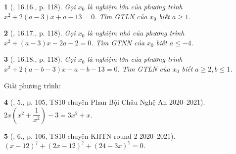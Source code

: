 \documentclass{article}
\newtheorem{baitoan}{}
\begin{document}
\begin{baitoan}[\cite{TLCT_THCS_Toan_9_dai_so}, 16.16., p. 118]
	Gọi $x_0$ là nghiệm lớn của phương trình $x^2 + 2(a - 3)x + a - 13 = 0$. Tìm {\rm GTLN} của $x_0$ biết $a\ge1$.
\end{baitoan}

\begin{baitoan}[\cite{TLCT_THCS_Toan_9_dai_so}, 16.17., p. 118]
	Gọi $x_0$ là nghiệm nhỏ của phương trình $x^2 + (a - 3)x - 2a - 2 = 0$. Tìm {\rm GTNN} của $x_0$ biết $a\le-4$.
\end{baitoan}

\begin{baitoan}[\cite{TLCT_THCS_Toan_9_dai_so}, 16.18., p. 118]
	Gọi $x_0$ là nghiệm lớn của phương trình $x^2 + 2(a - b - 3)x + a - b - 13 = 0$. Tìm {\rm GTLN} của $x_0$ biết $a\ge2,b\le1$.
\end{baitoan}
Giải phương trình:

\begin{baitoan}[\cite{Lam_An_Tuan_Toan_9_dai_so}, 5., p. 105, TS10 chuyên Phan Bội Châu Nghệ An 2020--2021]
	$2x\left(x^2 + \dfrac{1}{x^2}\right) - 3 = 3x^2 + x$.
\end{baitoan}

\begin{baitoan}[\cite{Lam_An_Tuan_Toan_9_dai_so}, 6., p. 106, TS10 chuyên KHTN round 2 2020--2021]
	$(x - 12)^7 + (2x - 12)^7 + (24 - 3x)^7 = 0$.
\end{baitoan}


\printbibliography[heading=bibintoc]
	
\end{document}
